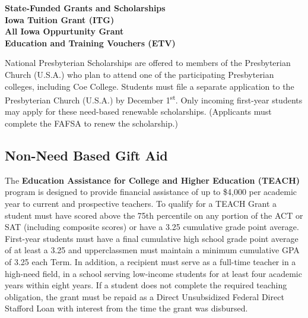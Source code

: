 \documentclass[
  letterpaper,
]{scrbook}
\begin{document}
\textbf{State-Funded Grants and Scholarships}\\
\textbf{Iowa Tuition Grant (ITG)}\\
\textbf{All Iowa Oppurtunity Grant}\\
\textbf{Education and Training Vouchers (ETV)}

National Presbyterian Scholarships are offered to members of the
Presbyterian Church (U.S.A.) who plan to attend one of the participating
Presbyterian colleges, including Coe College. Students must file a
separate application to the Presbyterian Church (U.S.A.) by December
1\textsuperscript{st}. Only incoming first-year students may apply for
these need-based renewable scholarships. (Applicants must complete the
FAFSA to renew the scholarship.)

\subsection{Non-Need Based Gift Aid}\label{non-need-based-gift-aid}

The \textbf{Education Assistance for College and Higher Education
(TEACH)} program is designed to provide financial assistance of up to
\$4,000 per academic year to current and prospective teachers. To
qualify for a TEACH Grant a student must have scored above the 75th
percentile on any portion of the ACT or SAT (including composite scores)
or have a 3.25 cumulative grade point average. First-year students must
have a final cumulative high school grade point average of at least a
3.25 and upperclassmen must maintain a minimum cumulative GPA of 3.25
each Term. In addition, a recipient must serve as a full-time teacher in
a high-need field, in a school serving low-income students for at least
four academic years within eight years. If a student does not complete
the required teaching obligation, the grant must be repaid as a Direct
Unsubsidized Federal Direct Stafford Loan with interest from the time
the grant was disbursed.
\end{document}
